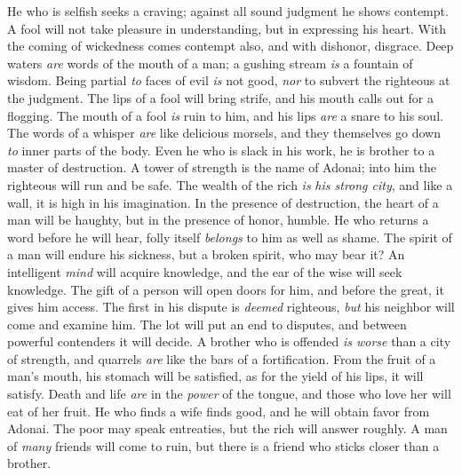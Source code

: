 \begin{biblechapter} %
\verse He who is selfish seeks a craving; 
against all sound judgment he shows contempt.
\verse A fool will not take pleasure in understanding, 
but in expressing his heart.
\verse With the coming of wickedness comes contempt also, 
and with dishonor, disgrace.
\verse Deep waters \textit{are} words of the mouth of a man; 
a gushing stream \textit{is} a fountain of wisdom.
\verse Being partial \textit{to} faces of evil \textit{is} not good, 
\textit{nor} to subvert the righteous at the judgment.
\verse The lips of a fool will bring strife, 
and his mouth calls out for a flogging.
\verse The mouth of a fool \textit{is} ruin to him, 
and his lips \textit{are} a snare to his soul.
\verse The words of a whisper \textit{are} like delicious morsels, 
and they themselves go down \textit{to} inner parts of the body.
\verse Even he who is slack in his work, 
he is brother to a master of destruction.
\verse A tower of strength is the name of Adonai; 
into him the righteous will run and be safe.
\verse The wealth of the rich \textit{is} \textit{his strong city}, 
and like a wall, it is high in his imagination.
\verse In the presence of destruction, the heart of a man will be haughty, 
but in the presence of honor, humble.
\verse He who returns a word before he will hear, 
folly itself \textit{belongs} to him as well as shame.
\verse The spirit of a man will endure his sickness, 
but a broken spirit, who may bear it?
\verse An intelligent \textit{mind} will acquire knowledge, 
and the ear of the wise will seek knowledge.
\verse The gift of a person will open doors for him, 
and before the great, it gives him access.
\verse The first in his dispute is \textit{deemed} righteous, 
\textit{but} his neighbor will come and examine him.
\verse The lot will put an end to disputes, 
and between powerful contenders it will decide.
\verse A brother who is offended \textit{is worse} than a city of strength, 
and quarrels \textit{are} like the bars of a fortification.
\verse From the fruit of a man’s mouth, his stomach will be satisfied, 
as for the yield of his lips, it will satisfy.
\verse Death and life \textit{are} in the \textit{power} of the tongue, 
and those who love her will eat of her fruit.
\verse He who finds a wife finds good, 
and he will obtain favor from Adonai.
\verse The poor may speak entreaties, 
but the rich will answer roughly.
\verse A man of \textit{many} friends will come to ruin, 
but there is a friend who sticks closer than a brother.
\end{biblechapter}

